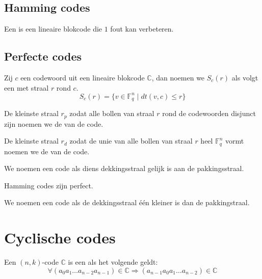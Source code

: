 \documentclass[main.tex]{subfiles}
\begin{document}
\subsection{Hamming codes}

\begin{de}
  Een  is een lineaire blokcode die $1$ fout kan verbeteren.
\end{de}


\subsection{Perfecte codes}
\begin{de}
  Zij $c$ een codewoord uit een lineaire blokcode $\mathbb{C}$, dan noemen we $S_{c}(r)$ als volgt een  met straal $r$ rond $c$.
  \[ S_{c}(r) = \{ v\in \mathbb{F}_{q}^{n} \mid dt(v,c) \le r \} \]
\end{de}

\begin{de}
  De kleinste straal $r_{p}$ zodat alle bollen van straal $r$ rond de codewoorden disjunct zijn noemen we de  van de code.
\end{de}

\begin{de}
  De kleinste straal $r_{d}$ zodat de unie van alle bollen van straal $r$ heel $\mathbb{F}_{q}^{n}$ vormt noemen we de  van de code.
\end{de}

\begin{de}
  We noemen een code  als diens dekkingsstraal gelijk is aan de pakkingsstraal.
\end{de}

\begin{st}
  Hamming codes zijn perfect.
\end{st}


\begin{de}
  We noemen een code  als de dekkingsstraal \'e\'en kleiner is dan de pakkingstraal.
\end{de}


\section{Cyclische codes}

\begin{de}
  Een $(n,k)$-code $\mathbb{C}$ is een  als het volgende geldt:
  \[ \forall (a_{0}a_{1}\dotsc a_{n-2}a_{n-1}) \in \mathbb{C} \Rightarrow (a_{n-1}a_{0}a_{1}\dotsc a_{n-2}) \in \mathbb{C} \]
\end{de}
\end{document}
